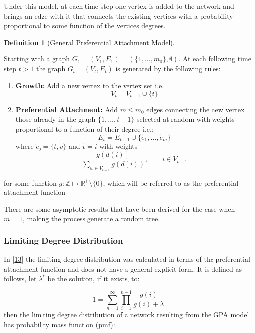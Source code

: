 \documentclass[
  10pt,
  a4paper,
]{scrreprt}
\providecommand{\tightlist}{%
  \setlength{\itemsep}{0pt}\setlength{\parskip}{0pt}}\usepackage{longtable,booktabs,array}
\theoremstyle{plain}
\theoremstyle{definition}
\newtheorem{definition}{Definition}[section]
\theoremstyle{plain}
\theoremstyle{remark}
\begin{document}
{Under this model, at each time step one vertex is added to the network
and brings an edge with it that connects the existing vertices with a
probability proportional to some function of the vertices degrees.

\begin{definition}[General Preferential Attachment
Model]\protect\hypertarget{def-gpa}{}\label{def-gpa}

Starting with a graph
\(G_1 = (V_1, E_1) = (\{1,\ldots,m_0\}, \emptyset)\). At each following
time step \(t>1\) the graph \(G_t = (V_t, E_t)\) is generated by the
following rules:

\begin{enumerate}
\def\labelenumi{\arabic{enumi}.}
\tightlist
\item
  \textbf{Growth:} Add a new vertex to the vertex set i.e.~\[
  V_t = V_{t-1} \cup \{t\}
  \]
\item
  \textbf{Preferential Attachment:} Add \(m\le m_0\) edges connecting
  the new vertex those already in the graph \(\{1,\ldots,t-1\}\)
  selected at random with weights proportional to a function of their
  degree i.e.: \[
  E_t  = E_{t-1} \cup \{\tilde e_1,\ldots,\tilde e_m\}
  \] where \(\tilde e_j = \{t,\tilde v\}\) and \(\tilde v = i\) with
  weights \[
  \displaystyle\frac{g(d(i))}{\sum_{w\in V_{t-1}} g(d(i))}, \qquad i\in V_{t-1}
  \]
\end{enumerate}

for some function \(g: \mathbb Z \mapsto \mathbb R^+\setminus\{0\}\),
which will be referred to as the preferential attachment function

\end{definition}

There are some asymptotic results that have been derived for the case
when \(m=1\), making the process generate a random tree.

\hypertarget{limiting-degree-distribution}{%
\subsubsection{Limiting Degree
Distribution}\label{limiting-degree-distribution}}

In {[}\protect\hyperlink{ref-rudas07}{13}{]} the limiting degree
distribution was calculated in terms of the preferential attachment
function and does not have a general explicit form. It is defined as
follows, let \(\lambda^*\) be the solution, if it exists, to:

\[
1=\sum_{n=1}^\infty \prod_{i=1}^{n-1}\displaystyle\frac{g(i)}{g(i)+\lambda}
\] then the limiting degree distribution of a network resulting from the
GPA model has probability mass function (pmf):

}
\end{document}
